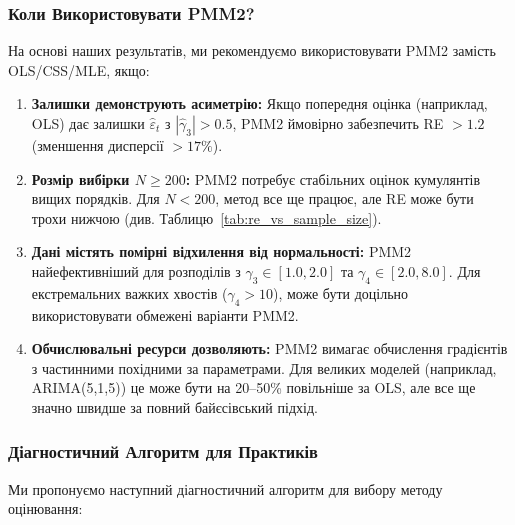\documentclass[12pt,a4paper]{article}
\begin{document}
\subsubsection{Коли Використовувати PMM2?}

На основі наших результатів, ми рекомендуємо використовувати PMM2 замість OLS/CSS/MLE, якщо:

\begin{enumerate}
    \item \textbf{Залишки демонструють асиметрію:} Якщо попередня оцінка (наприклад, OLS) дає залишки $\hat{\varepsilon}_t$ з $|\hat{\gamma}_3| > 0.5$, PMM2 ймовірно забезпечить RE $> 1.2$ (зменшення дисперсії $> 17\%$).

    \item \textbf{Розмір вибірки $N \geq 200$:} PMM2 потребує стабільних оцінок кумулянтів вищих порядків. Для $N < 200$, метод все ще працює, але RE може бути трохи нижчою (див. Таблицю~\ref{tab:re_vs_sample_size}).

    \item \textbf{Дані містять помірні відхилення від нормальності:} PMM2 найефективніший для розподілів з $\gamma_3 \in [1.0, 2.0]$ та $\gamma_4 \in [2.0, 8.0]$. Для екстремальних важких хвостів ($\gamma_4 > 10$), може бути доцільно використовувати обмежені варіанти PMM2.

    \item \textbf{Обчислювальні ресурси дозволяють:} PMM2 вимагає обчислення градієнтів з частинними похідними за параметрами. Для великих моделей (наприклад, ARIMA(5,1,5)) це може бути на 20--50\% повільніше за OLS, але все ще значно швидше за повний байєсівський підхід.
\end{enumerate}

\subsubsection{Діагностичний Алгоритм для Практиків}

Ми пропонуємо наступний діагностичний алгоритм для вибору методу оцінювання:
\end{document}
